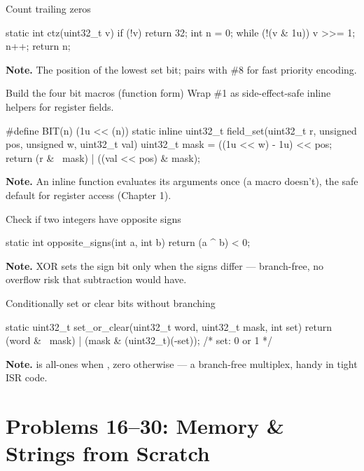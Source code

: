 \begin{gymproblem}{Count trailing zeros}
\begin{cgym}
static int ctz(uint32_t v) { if (!v) return 32; int n = 0; while (!(v & 1u)) { v >>= 1; n++; } return n; }
\end{cgym}
\textbf{Note.} The position of the lowest set bit; pairs with \#8 for fast
priority encoding.
\end{gymproblem}

\begin{gymproblem}{Build the four bit macros (function form)}
Wrap \#1 as side-effect-safe inline helpers for register fields.
\begin{cgym}
#define BIT(n) (1u << (n))
static inline uint32_t field_set(uint32_t r, unsigned pos,
                                 unsigned w, uint32_t val) {
    uint32_t mask = ((1u << w) - 1u) << pos;
    return (r & ~mask) | ((val << pos) & mask);
}
\end{cgym}
\textbf{Note.} An inline function evaluates its arguments once (a macro doesn't),
the safe default for register access (Chapter 1).
\end{gymproblem}

\begin{gymproblem}{Check if two integers have opposite signs}
\begin{cgym}
static int opposite_signs(int a, int b) { return (a ^ b) < 0; }
\end{cgym}
\textbf{Note.} XOR sets the sign bit only when the signs differ --- branch-free,
no overflow risk that subtraction would have.
\end{gymproblem}

\begin{gymproblem}{Conditionally set or clear bits without branching}
\begin{cgym}
static uint32_t set_or_clear(uint32_t word, uint32_t mask, int set) {
    return (word & ~mask) | (mask & (uint32_t)(-set));   /* set: 0 or 1 */
}
\end{cgym}
\textbf{Note.}  is all-ones when , zero otherwise ---
a branch-free multiplex, handy in tight ISR code.
\end{gymproblem}

\section{Problems 16--30: Memory \& Strings from Scratch}
\attempt

